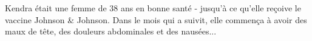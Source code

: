Kendra était une femme de 38 ans en bonne santé - jusqu'à ce qu'elle reçoive le
vaccine Johnson \& Johnson. Dans le mois qui a suivit, elle commença à avoir des
maux de tête, des douleurs abdominales et des nausées...

